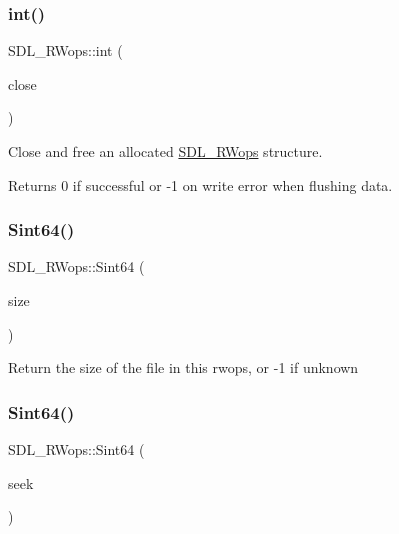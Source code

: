 \subsubsection{\texorpdfstring{int()}{int()}}
{\footnotesize\ttfamily S\+D\+L\+\_\+\+R\+Wops\+::int (\begin{DoxyParamCaption}\item[{\mbox{\hyperlink{begin__code_8h_a81faf4ba0455dc75f2e0507eddb79401}{S\+D\+L\+C\+A\+LL}} $\ast$}]{close }\end{DoxyParamCaption})}

Close and free an allocated \mbox{\hyperlink{struct_s_d_l___r_wops}{S\+D\+L\+\_\+\+R\+Wops}} structure.

\begin{DoxyReturn}{Returns}
0 if successful or -\/1 on write error when flushing data. 
\end{DoxyReturn}
\mbox{\label{struct_s_d_l___r_wops_a45f66dbb683a88281d96f83ca18c525f}} 
\subsubsection{\texorpdfstring{Sint64()}{Sint64()}\hspace{0.1cm}{\footnotesize\ttfamily [1/2]}}
{\footnotesize\ttfamily S\+D\+L\+\_\+\+R\+Wops\+::\+Sint64 (\begin{DoxyParamCaption}\item[{\mbox{\hyperlink{begin__code_8h_a81faf4ba0455dc75f2e0507eddb79401}{S\+D\+L\+C\+A\+LL}} $\ast$}]{size }\end{DoxyParamCaption})}

Return the size of the file in this rwops, or -\/1 if unknown \mbox{\label{struct_s_d_l___r_wops_a767114391a3d1b4a7c214da3e164acf5}} 
\subsubsection{\texorpdfstring{Sint64()}{Sint64()}\hspace{0.1cm}{\footnotesize\ttfamily [2/2]}}
{\footnotesize\ttfamily S\+D\+L\+\_\+\+R\+Wops\+::\+Sint64 (\begin{DoxyParamCaption}\item[{\mbox{\hyperlink{begin__code_8h_a81faf4ba0455dc75f2e0507eddb79401}{S\+D\+L\+C\+A\+LL}} $\ast$}]{seek }\end{DoxyParamCaption})}

